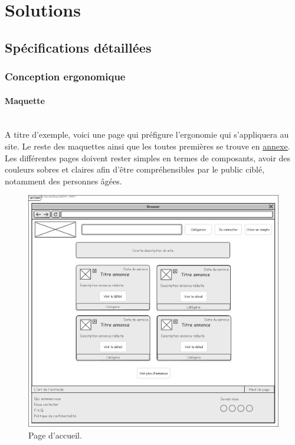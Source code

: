 \documentclass[a4paper,11pt]{article}
\begin{document}
\newpage


\section{Solutions}

\subsection{Spécifications détaillées}

\subsubsection{Conception ergonomique}
\paragraph{Maquette}\mbox{} \\

A titre d’exemple, voici une page qui préfigure l’ergonomie qui s’appliquera au site. Le reste des maquettes ainsi que les toutes premières se trouve en \underline{\hyperref[sec:maquettes-annexe]{annexe}}. Les différentes pages doivent rester
simples en termes de composants, avoir des couleurs sobres et claires afin d’être compréhensibles
par le public ciblé, notamment des personnes âgées.\\

\begin{figure}[H]
  \includegraphics[width=\linewidth]{../Conception/maquette/maquette-accueil.png}
  \caption{Page d'accueil.}
  \label{fig:maquette-accueil}
\end{figure}
\end{document}
